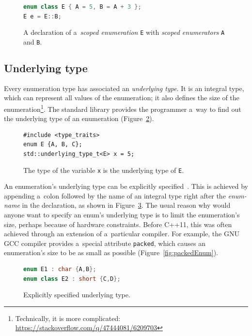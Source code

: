 \documentclass[nolot,nolof,nocover,printed]{fithesis3}
\newcommand{\stdN}[2]{\cite[#2]{#1}\xspace}
\begin{document}

\begin{figure}
\begin{lstlisting}[language=C++]
enum class E { A = 5, B = A + 3 };
E e = E::B;
\end{lstlisting}
\caption{A declaration of a~\textit{scoped enumeration} \lstinline|E| with \textit{scoped enumerators} \lstinline|A| and \lstinline|B|.}
\label{fig:scopedEnumDecl}
\end{figure}

\subsection{Underlying type}

Every enumeration type has associated an \textit{underlying type}. It is an integral type, which can represent all values of the enumeration; it also defines the size of the enumeration\footnote{Technically, it is more complicated: \url{https://stackoverflow.com/q/47444081/6209703}}. The standard library provides the programmer a~way to find out the underlying type of an enumeration (Figure~\ref{fig:stdUnderlyingType}).

\begin{figure}[ht]
\begin{lstlisting}
#include <type_traits>
enum E {A, B, C};
std::underlying_type_t<E> x = 5;
\end{lstlisting}
\caption{The type of the variable \lstinline|x| is the underlying type of \lstinline|E|.}
\label{fig:stdUnderlyingType}
\end{figure}

An enumeration's underlying type can be explicitly specified~\stdN{n4296}{\S 7.2/5}. This is achieved by appending a~colon followed by the name of an integral type right after the \textit{enum-name} in the declaration, as shown in Figure~\ref{fig:explicityleSpecifiedUnderlyingType}. The usual reason why would anyone want to specify an enum's underlying type is to limit the enumeration's size, perhaps because of hardware constraints. Before C++11, this was often achieved through an extension of a~particular compiler. For example, the GNU GCC compiler provides a~special attribute \lstinline|packed|, which causes an enumeration's size to be as small as possible (Figure~\ref{fig:packedEnum}).

\begin{figure}
\begin{lstlisting}[language=C++]
enum E1 : char {A,B};
enum class E2 : short {C,D};
\end{lstlisting}
\caption{Explicitly specified underlying type.}
\label{fig:explicityleSpecifiedUnderlyingType}
\end{figure}
\end{document}
